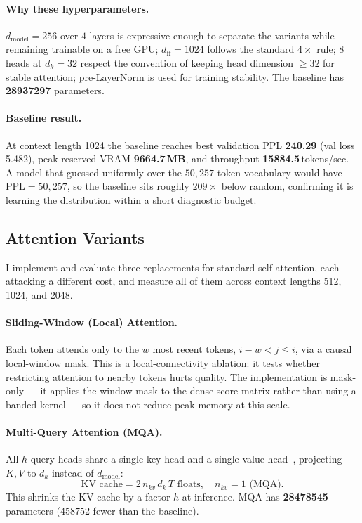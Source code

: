 \documentclass[11pt]{article}
\begin{document}
\paragraph{Why these hyperparameters.} $d_{\text{model}}=256$ over $4$ layers is
expressive enough to separate the variants while remaining trainable on a free
GPU; $d_{\text{ff}}=1024$ follows the standard $4\times$ rule; $8$ heads at
$d_k=32$ respect the convention of keeping head dimension $\ge 32$ for stable
attention; pre-LayerNorm is used for training stability. The baseline has
\textbf{\num{28937297}} parameters.

\paragraph{Baseline result.} At context length 1024 the baseline reaches
best validation PPL \textbf{240.29} (val loss 5.482), peak reserved VRAM
\textbf{9664.7\,MB}, and throughput \textbf{15884.5}\,tokens/sec. A model that
guessed uniformly over the $50{,}257$-token vocabulary would have
$\text{PPL}=50{,}257$, so the baseline sits roughly $209\times$ below random,
confirming it is learning the distribution within a short diagnostic budget.

\subsection{Attention Variants}
\label{sec:attn}
I implement and evaluate three replacements for standard self-attention, each
attacking a different cost, and measure all of them across context lengths
512, 1024, and 2048.

\paragraph{Sliding-Window (Local) Attention.} Each token attends only to the
$w$ most recent tokens, $i-w < j \le i$, via a causal local-window mask. This is
a local-connectivity ablation: it tests whether restricting attention to nearby
tokens hurts quality. The implementation is mask-only --- it applies the window
mask to the dense score matrix rather than using a banded kernel --- so it does
not reduce peak memory at this scale.

\paragraph{Multi-Query Attention (MQA).} All $h$ query heads share a single key
head and a single value head~\cite{shazeer2019}, projecting $K,V$ to $d_k$
instead of $d_{\text{model}}$:
\[
\text{KV cache}=2\,n_{kv}\,d_k\,T \text{ floats},\quad n_{kv}=1 \text{ (MQA)}.
\]
This shrinks the KV cache by a factor $h$ at inference. MQA has
\textbf{\num{28478545}} parameters ($\num{458752}$ fewer than the baseline).
\end{document}
